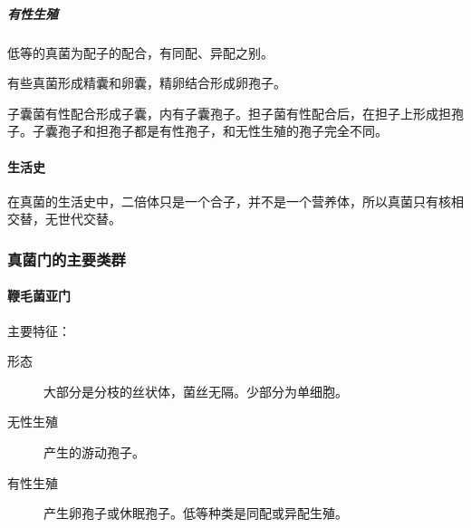 \subparagraph{有性生殖}

低等的真菌为配子的配合，有同配、异配之别。

有些真菌形成精囊和卵囊，精卵结合形成卵孢子。

子囊菌有性配合形成子囊，内有子囊孢子。担子菌有性配合后，在担子上形成担孢子。子囊孢子和担孢子都是有性孢子，和无性生殖的孢子完全不同。

\paragraph{生活史}

在真菌的生活史中，二倍体只是一个合子，并不是一个营养体，所以真菌只有核相交替，无世代交替。

\subsubsection{真菌门的主要类群}

\paragraph{鞭毛菌亚门}

主要特征：

\begin{description}
	\item[形态] 大部分是分枝的丝状体，菌丝无隔。少部分为单细胞。
	\item[无性生殖] 产生的游动孢子。
	\item[有性生殖] 产生卵孢子或休眠孢子。低等种类是同配或异配生殖。
\end{description}

